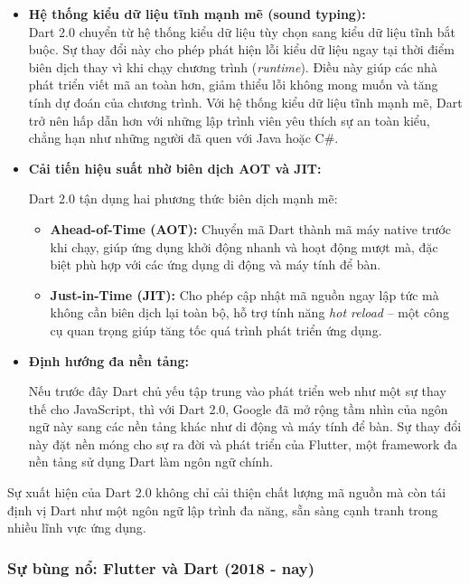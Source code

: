 \documentclass[../DoAn.tex]{subfiles}
\numberwithin{figure}{chapter}
\begin{document}
\begin{itemize}
    \item \textbf{Hệ thống kiểu dữ liệu tĩnh mạnh mẽ (sound typing):}  \\[0.5em]
    Dart 2.0 chuyển từ hệ thống kiểu dữ liệu tùy chọn sang kiểu dữ liệu tĩnh bắt buộc. Sự thay đổi này cho phép phát hiện lỗi kiểu dữ liệu ngay tại thời điểm biên dịch thay vì khi chạy chương trình (\textit{runtime}). Điều này giúp các nhà phát triển viết mã an toàn hơn, giảm thiểu lỗi không mong muốn và tăng tính dự đoán của chương trình. Với hệ thống kiểu dữ liệu tĩnh mạnh mẽ, Dart trở nên hấp dẫn hơn với những lập trình viên yêu thích sự an toàn kiểu, chẳng hạn như những người đã quen với Java hoặc C\#.

    \item \textbf{Cải tiến hiệu suất nhờ biên dịch AOT và JIT:} 
    
    Dart 2.0 tận dụng hai phương thức biên dịch mạnh mẽ:

    \begin{itemize}
        \item \textbf{Ahead-of-Time (AOT):} Chuyển mã Dart thành mã máy native trước khi chạy, giúp ứng dụng khởi động nhanh và hoạt động mượt mà, đặc biệt phù hợp với các ứng dụng di động và máy tính để bàn.
        \item \textbf{Just-in-Time (JIT):} Cho phép cập nhật mã nguồn ngay lập tức mà không cần biên dịch lại toàn bộ, hỗ trợ tính năng \textit{hot reload} – một công cụ quan trọng giúp tăng tốc quá trình phát triển ứng dụng.
    \end{itemize}

    \item \textbf{Định hướng đa nền tảng:} 
    
    Nếu trước đây Dart chủ yếu tập trung vào phát triển web như một sự thay thế cho JavaScript, thì với Dart 2.0, Google đã mở rộng tầm nhìn của ngôn ngữ này sang các nền tảng khác như di động và máy tính để bàn. Sự thay đổi này đặt nền móng cho sự ra đời và phát triển của Flutter, một framework đa nền tảng sử dụng Dart làm ngôn ngữ chính.
\end{itemize}

Sự xuất hiện của Dart 2.0 không chỉ cải thiện chất lượng mã nguồn mà còn tái định vị Dart như một ngôn ngữ lập trình đa năng, sẵn sàng cạnh tranh trong nhiều lĩnh vực ứng dụng.

\subsubsection{Sự bùng nổ: Flutter và Dart (2018 - nay)}
\end{document}
